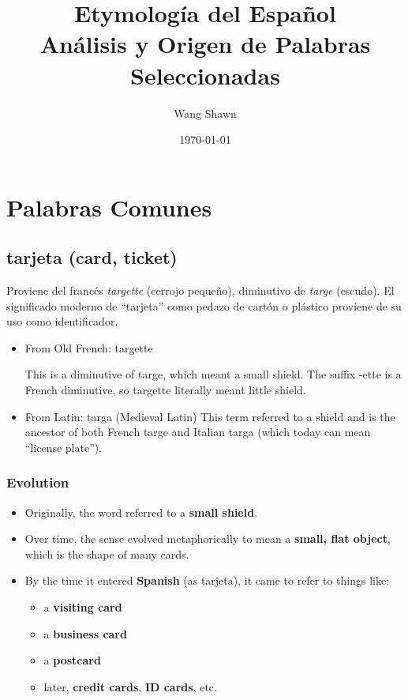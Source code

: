 \documentclass[12pt]{book}
\title{\Huge Etymología del Español\\\large Análisis y Origen de Palabras Seleccionadas}
\author{Wang Shawn}
\date{\today}
\newcommand{\wordentry}[3]{
	\section*{\textnormal{\LARGE \textbf{#1}} \large (#2)}
	\addcontentsline{toc}{section}{#1} %
	\begin{etymologybox}
		#3
	\end{etymologybox}
}
\begin{document}
	\maketitle
	\tableofcontents
	\newpage
	
	\chapter{Palabras Comunes}
	
	\wordentry{tarjeta}{card, ticket}{
	Proviene del francés \textit{targette} (cerrojo pequeño), diminutivo de \textit{targe} (escudo). El significado moderno de “tarjeta” como pedazo de cartón o plástico proviene de su uso como identificador.
	\begin{itemize}
		\item From Old French: targette
		
		This is a diminutive of targe, which meant a small shield. The suffix -ette is a French diminutive, so targette literally meant little shield.
		
		\item From Latin: targa (Medieval Latin)
		This term referred to a shield and is the ancestor of both French targe and Italian targa (which today can mean “license plate”).
	\end{itemize}
	}
	
	\subsection*{Evolution}
	
	\begin{itemize}
		\item Originally, the word referred to a \textbf{small shield}.
		\item Over time, the sense evolved metaphorically to mean a \textbf{small, flat object}, which is the shape of many cards.
		\item By the time it entered \textbf{Spanish} (as tarjeta), it came to refer to things like:
		\begin{itemize}
			\item a \textbf{visiting card}
			\item a \textbf{business card}
			\item a \textbf{postcard}
			\item later, \textbf{credit cards}, \textbf{ID cards}, etc.
		\end{itemize}
	\end{itemize}
	
\end{document}
